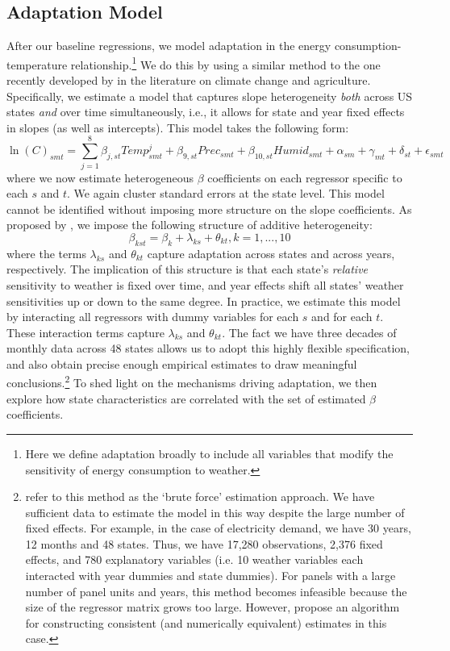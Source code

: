 \documentclass[11pt]{article}
\begin{document}
\subsection{Adaptation Model}

After our baseline regressions, we model adaptation in the energy consumption-temperature relationship.\footnote{ Here we define adaptation broadly to include all variables that modify the sensitivity of energy consumption to weather.} We do this by using a similar method to the one recently developed by \cite{keane2020climate} in the literature on climate change and agriculture. Specifically, we estimate a model that captures slope heterogeneity \textit{both} across US states \textit{and} over time simultaneously, i.e., it allows for state and year fixed effects in slopes (as well as intercepts). This model takes the following form:
\begin{equation}
\ln(C)_{smt} = \sum_{j=1}^{8} \beta_{j,st} Temp_{smt}^{j} + \beta_{9, st} Prec_{smt} + \beta_{10,st} Humid_{smt} + \alpha_{sm} + \gamma_{mt} + \delta_{st} + \epsilon_{smt} \label{eq:hetero}%
\end{equation}
where we now estimate heterogeneous $\beta$ coefficients on each regressor specific to each $s$ and $t$. We again cluster standard errors at the state level. This model cannot be identified without imposing more structure on the slope coefficients. As proposed by \cite{keane2020climate}, we impose the following structure of additive heterogeneity:
\begin{equation}
\beta_{kst} = \beta_{k} + \lambda_{ks} + \theta_{kt}, k=1,...,10  \label{eq:hetero2}%
\end{equation}
where the terms $\lambda_{ks}$ and $\theta_{kt}$ capture adaptation across states and across years, respectively. The implication of this structure is that each state's \textit{relative} sensitivity to weather is fixed over time, and year effects shift all states' weather sensitivities up or down to the same degree. In practice, we estimate this model by interacting all regressors with dummy variables for each $s$ and for each $t$. These interaction terms capture $\lambda_{ks}$ and $\theta_{kt}$. The fact we have three decades of monthly data across 48 states allows us to adopt this highly flexible specification, and also obtain precise enough empirical estimates to draw meaningful conclusions.\footnote{ \cite{keane2020climate} refer to this method as the `brute force' estimation approach. We have sufficient data to estimate the model in this way despite the large number of fixed effects. For example, in the case of electricity demand, we have 30 years, 12 months and 48 states. Thus, we have 17,280 observations, 2,376 fixed effects, and 780 explanatory variables (i.e. 10 weather variables each interacted with year dummies and state dummies). For panels with a large number of panel units and years, this method becomes infeasible because the size of the regressor matrix grows too large. However, \cite{keane2020climate} propose an algorithm for constructing consistent (and numerically equivalent) estimates in this case.} To shed light on the mechanisms driving adaptation, we then explore how state characteristics are correlated with the set of estimated $\beta$ coefficients.
\end{document}
